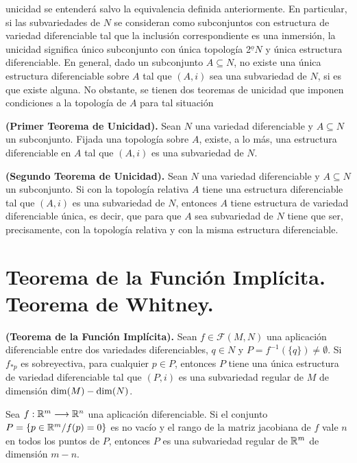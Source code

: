 \documentclass[cursovd_portada.tex]{subfiles}
\begin{document}
unicidad se entenderá salvo la equivalencia definida
anteriormente. En particular, si las subvariedades de $N$ se
consideran como subconjuntos con estructura de variedad
diferenciable tal que la inclusión correspondiente es una
inmersión, la unicidad significa único subconjunto con
única topología 2$^{\underline{o}}N$ y única
estructura diferenciable. En general, dado un subconjunto
$A\subseteq N$, no existe una única estructura diferenciable
sobre $A$ tal que $(A,i)$ sea una subvariedad de $N$, si es que
existe alguna. No obstante, se tienen dos teoremas de unicidad que
imponen condiciones a la topología de $A$ para tal
situación
\begin{teorema}
{\bf (Primer Teorema de Unicidad).} Sean $N$ una variedad
diferenciable y $A\subseteq N$ un subconjunto. Fijada una
topología sobre $A$, existe, a lo más, una estructura
diferenciable en $A$ tal que $(A,i)$ es una subvariedad de $N$.
\end{teorema}
\begin{teorema}
{\bf (Segundo Teorema de Unicidad).} Sean $N$ una variedad
diferenciable y $A\subseteq N$ un subconjunto. Si con la
topología relativa $A$ tiene una estructura diferenciable tal
que $(A,i)$ es una subvariedad de $N$, entonces $A$ tiene
estructura de variedad diferenciable única, es decir, que para
que $A$ sea subvariedad de $N$ tiene que ser, precisamente, con la
topología relativa y con la misma estructura diferenciable.
\end{teorema}
\section{Teorema de la Función Implícita. Teorema de Whitney.}
\begin{teorema}
{\bf (Teorema de la Función Implícita).} Sean
$f\in\mathcal{F}(M,N)$ una aplicación diferenciable entre dos
variedades diferenciables, $q\in N$ y
$P=f^{-1}(\{q\})\neq\emptyset$. Si $f_{*p}$ es sobreyectiva, para
cualquier $p\in P$, entonces $P$ tiene una única estructura de
variedad diferenciable tal que $(P,i)$ es una subvariedad regular
de $M$ de dimensión ${\rm dim}(M)-{\rm dim}(N)$.
\end{teorema}
\begin{coro} Sea $f:\mathbb{R}^m\longrightarrow\mathbb{R}^n$ una aplicación
diferenciable. Si el conjunto $P=\{p\in\mathbb{R}^m/f(p)=0\}$ es no
vacío y el rango de la matriz jacobiana de $f$ vale $n$ en
todos los puntos de $P$, entonces $P$ es una subvariedad regular
de $\mathbb{R}^m$ de dimensión $m-n$.
\end{coro}
\end{document}
